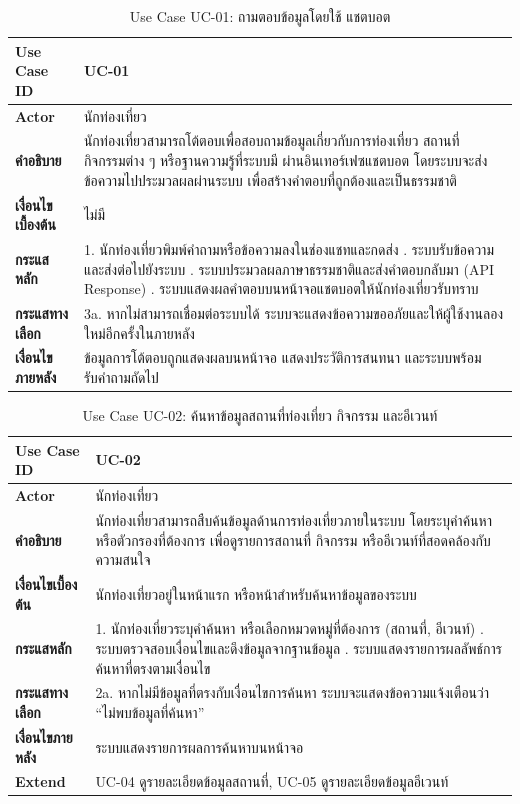\begin{table}[H]
\centering
\caption{Use Case UC-01: ถามตอบข้อมูลโดยใช้ แชตบอต}
\label{tab:uc01}
\begin{tabular}{|p{3.2cm}|p{10cm}|}
\hline
\textbf{Use Case ID} & UC-01 \\ \hline
\textbf{Actor} & นักท่องเที่ยว \\ \hline
\textbf{คำอธิบาย} & นักท่องเที่ยวสามารถโต้ตอบเพื่อสอบถามข้อมูลเกี่ยวกับการท่องเที่ยว สถานที่ กิจกรรมต่าง ๆ หรือฐานความรู้ที่ระบบมี ผ่านอินเทอร์เฟซแชตบอต โดยระบบจะส่งข้อความไปประมวลผลผ่านระบบ เพื่อสร้างคำตอบที่ถูกต้องและเป็นธรรมชาติ \\ \hline
\textbf{เงื่อนไขเบื้องต้น} & ไม่มี \\ \hline
\textbf{กระแสหลัก} & 1. นักท่องเที่ยวพิมพ์คำถามหรือข้อความลงในช่องแชทและกดส่ง \newline 2. ระบบรับข้อความและส่งต่อไปยังระบบ \newline 3. ระบบประมวลผลภาษาธรรมชาติและส่งคำตอบกลับมา (API Response) \newline 4. ระบบแสดงผลคำตอบบนหน้าจอแชตบอตให้นักท่องเที่ยวรับทราบ \\ \hline
\textbf{กระแสทางเลือก} & 3a. หากไม่สามารถเชื่อมต่อระบบได้ ระบบจะแสดงข้อความขออภัยและให้ผู้ใช้งานลองใหม่อีกครั้งในภายหลัง \\ \hline
\textbf{เงื่อนไขภายหลัง} & ข้อมูลการโต้ตอบถูกแสดงผลบนหน้าจอ แสดงประวัติการสนทนา และระบบพร้อมรับคำถามถัดไป \\
\hline
\end{tabular}
\end{table}

\begin{table}[H]
\centering
\caption{Use Case UC-02: ค้นหาข้อมูลสถานที่ท่องเที่ยว กิจกรรม และอีเวนท์}
\label{tab:uc02}
\begin{tabular}{|p{3.2cm}|p{10cm}|}
\hline
\textbf{Use Case ID} & UC-02 \\ \hline
\textbf{Actor} & นักท่องเที่ยว \\ \hline
\textbf{คำอธิบาย} & นักท่องเที่ยวสามารถสืบค้นข้อมูลด้านการท่องเที่ยวภายในระบบ โดยระบุคำค้นหาหรือตัวกรองที่ต้องการ เพื่อดูรายการสถานที่ กิจกรรม หรืออีเวนท์ที่สอดคล้องกับความสนใจ \\ \hline
\textbf{เงื่อนไขเบื้องต้น} & นักท่องเที่ยวอยู่ในหน้าแรก หรือหน้าสำหรับค้นหาข้อมูลของระบบ \\ \hline
\textbf{กระแสหลัก} & 1. นักท่องเที่ยวระบุคำค้นหา หรือเลือกหมวดหมู่ที่ต้องการ (สถานที่, อีเวนท์) \newline 2. ระบบตรวจสอบเงื่อนไขและดึงข้อมูลจากฐานข้อมูล \newline 3. ระบบแสดงรายการผลลัพธ์การค้นหาที่ตรงตามเงื่อนไข \\ \hline
\textbf{กระแสทางเลือก} & 2a. หากไม่มีข้อมูลที่ตรงกับเงื่อนไขการค้นหา ระบบจะแสดงข้อความแจ้งเตือนว่า ``ไม่พบข้อมูลที่ค้นหา'' \\ \hline
\textbf{เงื่อนไขภายหลัง} & ระบบแสดงรายการผลการค้นหาบนหน้าจอ \\ \hline
\textbf{Extend} & UC-04 ดูรายละเอียดข้อมูลสถานที่, UC-05 ดูรายละเอียดข้อมูลอีเวนท์ \\
\hline
\end{tabular}
\end{table}

